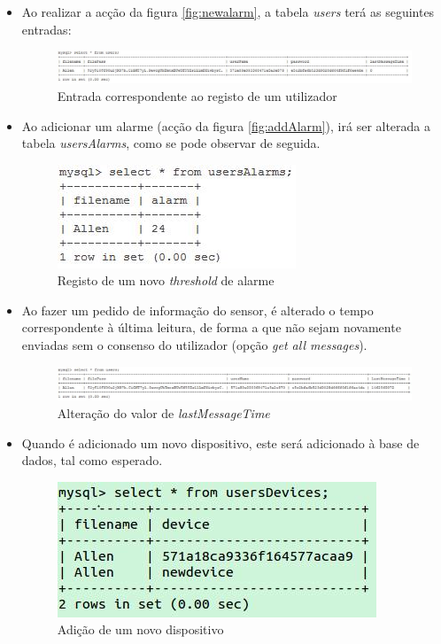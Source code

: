 \documentclass[a4paper]{article}
\begin{document}
\begin{itemize}
\item Ao realizar a acção da figura \ref{fig:newalarm}, a tabela \textit{users} terá as seguintes entradas:

\begin{figure}[H]
\includegraphics[width=1.2\linewidth]{logfirst.png}
  \caption{Entrada correspondente ao registo de um utilizador}\label{fig:db-first}
\end{figure}

\item Ao adicionar um alarme (acção da figura \ref{fig:addAlarm}), irá ser alterada a tabela \textit{usersAlarms}, como se pode observar de seguida.

\begin{figure}[H]
\centering
\includegraphics[scale=0.5]{newalarmm.png}
  \caption{Registo de um novo \textit{threshold} de alarme}\label{fig:newalarmm}
\end{figure}

\item Ao fazer um pedido de informação do sensor, é alterado o tempo correspondente à última leitura, de forma a que não sejam novamente enviadas sem o consenso do utilizador (opção \textit{get all messages}).

\begin{figure}[H]
\centering
\includegraphics[width=1.2\linewidth]{newtime.png}
  \caption{Alteração do valor de \textit{lastMessageTime}}\label{fig:newtime}
\end{figure}

\item Quando é adicionado um novo dispositivo, este será adicionado à base de dados, tal como esperado.

\begin{figure}[H]
\centering
\includegraphics[scale=0.4]{newdevvv.png}
  \caption{Adição de um novo dispositivo}\label{fig:newdevvv}
\end{figure}

\end{itemize}
\end{document}
